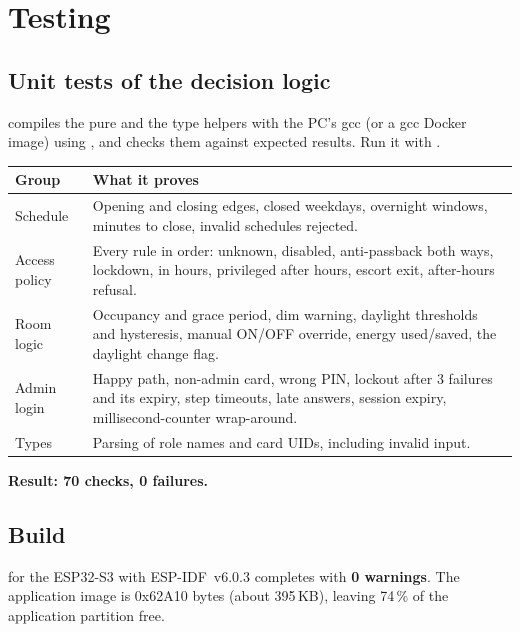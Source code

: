 \section{Testing}
\label{sec:testing}

\subsection{Unit tests of the decision logic}
 compiles the pure  and the type
helpers with the PC's gcc (or a gcc Docker image) using , and checks
them against expected results. Run it with .

\begin{center}
\small
\begin{tabularx}{\linewidth}{@{}lL@{}}
\toprule
Group & What it proves \\
\midrule
Schedule & Opening and closing edges, closed weekdays, overnight windows, minutes to close,
  invalid schedules rejected. \\
Access policy & Every rule in order: unknown, disabled, anti-passback both ways, lockdown,
  in hours, privileged after hours, escort exit, after-hours refusal. \\
Room logic & Occupancy and grace period, dim warning, daylight thresholds and hysteresis, manual
  ON/OFF override, energy used/saved, the daylight change flag. \\
Admin login & Happy path, non-admin card, wrong PIN, lockout after 3 failures and its expiry,
  step timeouts, late answers, session expiry, millisecond-counter wrap-around. \\
Types & Parsing of role names and card UIDs, including invalid input. \\
\bottomrule
\end{tabularx}
\end{center}
\textbf{Result: 70 checks, 0 failures.}

\subsection{Build}
 for the ESP32-S3 with ESP-IDF~v6.0.3 completes with \textbf{0 warnings}. The
application image is 0x62A10 bytes (about 395\,KB), leaving 74\,\% of the application partition
free.

